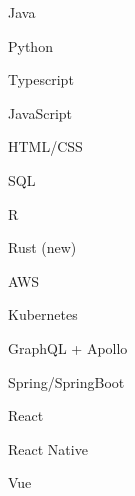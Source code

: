 \documentclass[letterpaper]{deedy-resume-openfont} %
\begin{document}
\sectionheadersep
\begin{tightemize}
\item Java
\item Python
\item Typescript
\item JavaScript
\item HTML/CSS
\item SQL
\item R
\item Rust (new)
\end{tightemize}

\sectionsep
\sectionsep

\sectionheadersep
\begin{tightemize}
\item AWS
\item Kubernetes
\item GraphQL + Apollo
\item Spring/SpringBoot
\item React
\item React Native
\item Vue
\end{tightemize}
\end{document}
